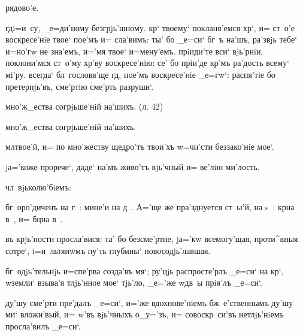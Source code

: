 рядово'е.%

гд i=и~су, _е=ди'ному безгрjь'шному. кр` твоему` 
покланя'емся хр`, и= ст~о'е воскресе'нiе твое` пое'мъ 
и= сла'вимъ: ты' бо _е=си` бг~ъ на'шъ, ра'звjь тебе` 
и=но'гw не зна'емъ, и='мя твое` и=мену'емъ. прiиди'те 
вси` вjь'рнiи, поклони'мся ст~о'му хр'ву 
воскресе'нiю: се' бо прiи'де кр'мъ ра'дость всему` 
мi'ру. всегда` бл~гословя'ще гд, пое'мъ воскресе'нiе 
_е=гw`: распя'тiе бо претерпjь'въ, сме'ртiю сме'рть 
разруши`.


мно'ж_ества согрjьше'нiй на'шихъ. (л. 42)

мно'ж_ества согрjьше'нiй на'шихъ.

мл твое'й, и= по мно'жеству щедро'тъ твои'хъ w=чи'сти 
беззако'нiе мое`.

jа='коже прорече`, даде` на'мъ живо'тъ вjь'чный и= ве'лiю 
ми'лость.


чл~вjьколю'бiемъ:

бг~оро'диченъ на г~: мине'и на д~. А='ще же пра'зднуется 
ст~ы'й, на s~: кр на в~, и= бц на в~.%



въ крjь'пости просла'вися: та' бо безсме'ртне, jа='кw 
всемогу'щая, проти^вныя сотре`, i=и~льтянwмъ пу'ть 
глубины` новосодjь'лавшая.


бг~одjь'тельнjь и=спе'рва созда'въ мя`; ру'цjь 
распросте'рлъ _е=си` на кр`, w\т земли` взыва'я 
тлjь'нное мое` тjь'ло, _е='же w\т дв~ы прiя'лъ _е=си`.

ду'шу сме'рти пре'далъ _е=си`, и='же вдохнове'нiемъ 
бж~е'ственнымъ ду'шу ми` вложи'вый, и= w'въ 
вjь'чныхъ о_у='зъ, и= совоскр~си'въ нетлjь'нiемъ 
просла'вилъ _е=си`.


